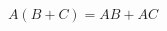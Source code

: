 \documentclass[10pt,landscape]{article}
\begin{document}
\begin{multicols}{4}
$$
A(B + C) = AB + AC
$$












\end{multicols}
\end{document}
